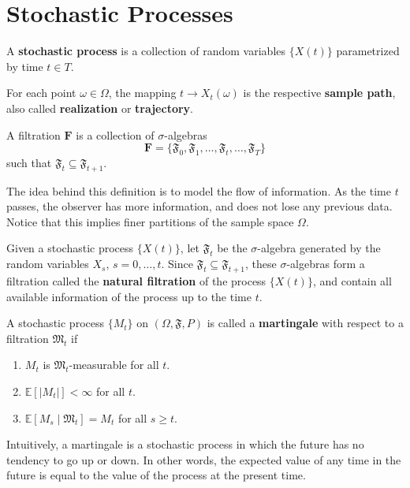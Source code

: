 \section{Stochastic Processes}

\begin{definition}
	A \textbf{stochastic process} is a collection of random variables $\{ X(t) \}$ parametrized by time $t \in T$.  
	
	For each point $\omega \in \Omega$, the mapping $t \longrightarrow X_t(\omega)$ is the respective \textbf{sample path}, also called \textbf{realization} or \textbf{trajectory}.
\end{definition}

\begin{definition}[Filtration]
	A filtration $\textbf{F}$ is a collection of $\sigma$-algebras
	\[
		\textbf{F} = \{ \mathfrak{F}_0, \mathfrak{F}_1, \ldots, \mathfrak{F}_t, \ldots, \mathfrak{F}_T \}
	\]
	such that $\mathfrak{F}_t \subseteq \mathfrak{F}_{t+1}$.
\end{definition}

The idea behind this definition is to model the flow of information. As the time $t$ passes, the observer has more information, and does not lose any previous data. Notice that this implies finer partitions of the sample space $\Omega$.

Given a stochastic process $\{ X(t) \}$, let $\mathfrak{F}_t$ be the $\sigma$-algebra generated by the random variables $X_s$, $s = 0, \ldots, t$. Since $\mathfrak{F}_t \subseteq \mathfrak{F}_{t+1}$, these $\sigma$-algebras form a filtration called the \textbf{natural filtration} of the process $\{ X(t) \}$, and contain all available information of the process up to the time $t$.

\begin{definition}[Martingale]
	A stochastic process $\{M_t \}$ on $(\Omega, \mathfrak{F}, P)$ is called a \textbf{martingale} with respect to a filtration $\mathfrak{M}_t$ if 
	\begin{enumerate}
		\item $M_t$ is $\mathfrak{M}_t$-measurable for all $t$.
		\item $\mathbb{E}[|M_t|] < \infty$ for all $t$.
		\item $\mathbb{E}[M_s  \mid  \mathfrak{M}_t] = M_t$ for all $s \geq t$.
	\end{enumerate}
\end{definition}

Intuitively, a martingale is a stochastic process in which the future has no tendency to go up or down. In other words, the expected value of any time in the future is equal to the value of the process at the present time.

